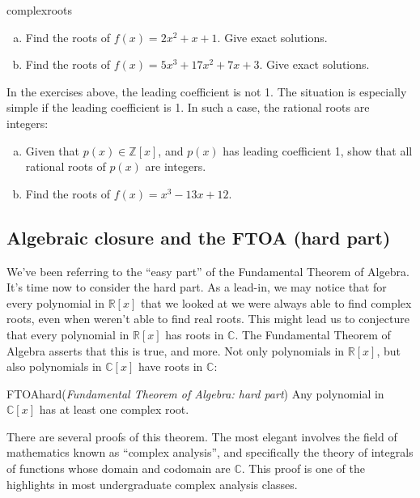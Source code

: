 \begin{exercise}{complexroots}
\begin {enumerate}[(a)]
\item
Find the roots of $f(x)=2x^2+x+1$. Give exact solutions.
\item
Find the roots of $f(x)=5x^3+17x^2+7x+3$. Give exact solutions. 
\end{enumerate}
\end{exercise}
 
In the exercises above, the leading coefficient is not 1. The situation is especially simple if the leading coefficient is 1. In such a case, the rational  roots are integers:

\begin{exercise}{}
\begin{enumerate}[(a)]
\item
Given that $p(x)  \in \mathbb{Z}[x]$, and $p(x)$ has leading coefficient 1, show that all rational roots of $p(x)$ are integers.
\item
Find the roots of $f(x)=x^3-13x+12$.
\end{enumerate}
\end{exercise}


\subsection{Algebraic closure and the FTOA (hard part)}

We've been referring to the ``easy part'' of the Fundamental Theorem of Algebra. It's time now to consider the hard part. As a lead-in, we may notice that  for every polynomial in $\mathbb{R}[x]$ that we looked at we were always able to find complex roots, even when weren't able to find real roots. This might lead us to conjecture that every polynomial in $\mathbb{R}[x]$ has roots in $\mathbb{C}$.  The Fundamental Theorem of Algebra asserts that this is true, and more.  Not only polynomials in $\mathbb{R}[x]$, but also polynomials in $\mathbb{C}[x]$ have roots in $\mathbb{C}$:  

\begin{prop}{FTOAhard}(\emph{Fundamental Theorem of Algebra: hard part})
Any polynomial in $\mathbb{C}[x]$ has at least one complex root.
\end {prop}

There are several proofs of this theorem. The most elegant involves the field of mathematics known as ``complex analysis'', and specifically the theory of integrals of functions whose domain and codomain are $\mathbb{C}$.  This proof is one of the highlights in most undergraduate complex analysis classes.

